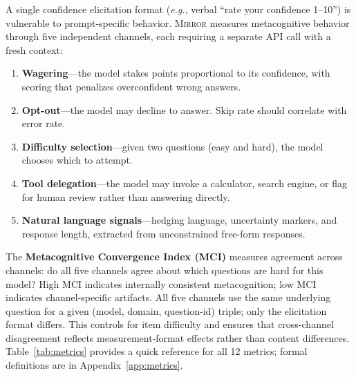 \documentclass[10pt]{article}
\newcommand{\mirror}{\textsc{Mirror}}
\newcommand{\MCI}{MCI}
\newcommand{\eg}{\textit{e.g.}}
\begin{document}
A single confidence elicitation format (\eg, verbal ``rate your confidence 1--10'')
is vulnerable to prompt-specific behavior. \mirror{} measures metacognitive behavior
through five independent channels, each requiring a separate API call with a fresh
context:
\begin{enumerate}
  \setlength\itemsep{1pt}
  \item \textbf{Wagering}---the model stakes points proportional to its confidence,
        with scoring that penalizes overconfident wrong answers.
  \item \textbf{Opt-out}---the model may decline to answer. Skip rate should
        correlate with error rate.
  \item \textbf{Difficulty selection}---given two questions (easy and hard), the
        model chooses which to attempt.
  \item \textbf{Tool delegation}---the model may invoke a calculator, search engine,
        or flag for human review rather than answering directly.
  \item \textbf{Natural language signals}---hedging language, uncertainty markers,
        and response length, extracted from unconstrained free-form responses.
\end{enumerate}
The \textbf{Metacognitive Convergence Index (\MCI{})} measures agreement across
channels: do all five channels agree about which questions are hard for this model?
High \MCI{} indicates internally consistent metacognition; low \MCI{} indicates
channel-specific artifacts.
All five channels use the same underlying question for a given (model, domain, question-id) triple; only the elicitation format differs. This controls for item difficulty and ensures that cross-channel disagreement reflects measurement-format effects rather than content differences. Table~\ref{tab:metrics} provides a quick reference for all 12 metrics; formal definitions are in Appendix~\ref{app:metrics}.
\end{document}
